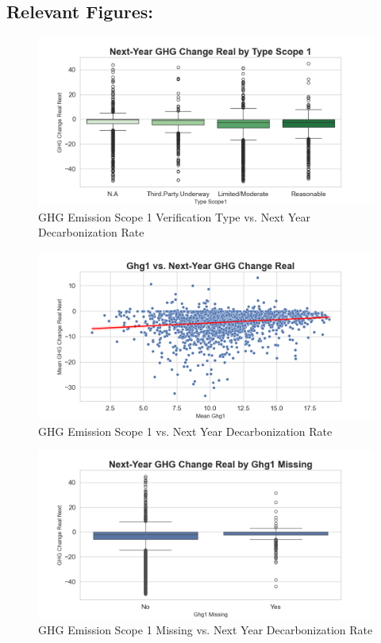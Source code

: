 \subsection{Relevant Figures:}
\begin{figure}[H]
\centering
  \includegraphics[width=\textwidth]{figures/ghg_change_real_next_by_type_scope1.png}
\caption{GHG Emission Scope 1 Verification Type vs. Next Year Decarbonization Rate}
\label{fig:ghg_change_real_next_by_ghg_type}
\end{figure}

\begin{figure}[H]
\centering
    \includegraphics[width=\textwidth]{figures/ghg1_vs_ghg_change_real_next.png}
\caption{GHG Emission Scope 1 vs. Next Year Decarbonization Rate}
\label{fig:ghg1_vs_ghg_change_real_next}
\end{figure}

    

\begin{figure}[H]
\centering
  \includegraphics[width=\textwidth]{figures/ghg_change_real_next_by_ghg1_na.png}
\caption{GHG Emission Scope 1 Missing vs. Next Year Decarbonization Rate}
\label{fig:ghg_change_real_next_by_ghg1_na}
\end{figure}

